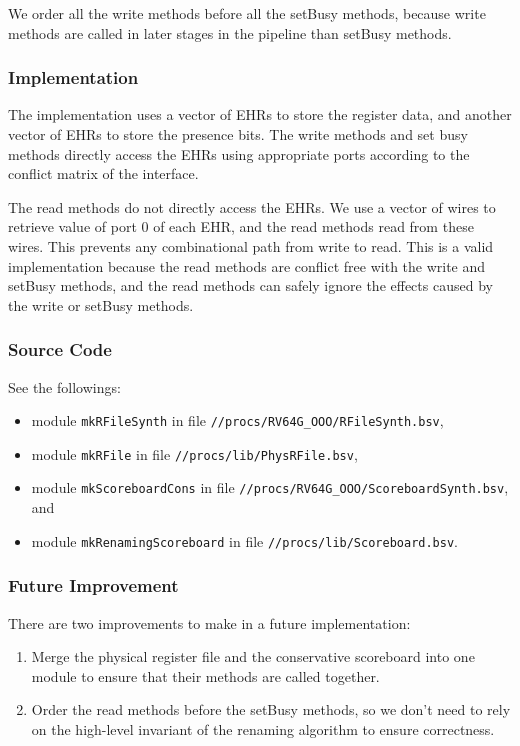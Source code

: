 We order all the write methods before all the setBusy methods, because write methods are called in later stages in the pipeline than setBusy methods.

\subsubsection{Implementation}
The implementation uses a vector of EHRs to store the register data, and another vector of EHRs to store the presence bits.
The write methods and set busy methods directly access the EHRs using appropriate ports according to the conflict matrix of the interface.

The read methods do not directly access the EHRs.
We use a vector of wires to retrieve value of port 0 of each EHR, and the read methods read from these wires.
This prevents any combinational path from write to read.
This is a valid implementation because the read methods are conflict free with the write and setBusy methods, and the read methods can safely ignore the effects caused by the write or setBusy methods.

\subsubsection{Source Code}
See the followings:
\begin{itemize}
    \item module \texttt{mkRFileSynth} in file \texttt{//procs/RV64G\_OOO/RFileSynth.bsv},
    \item module \texttt{mkRFile} in file \texttt{//procs/lib/PhysRFile.bsv},
    \item module \texttt{mkScoreboardCons} in file \texttt{//procs/RV64G\_OOO/ScoreboardSynth.bsv}, and
    \item module \texttt{mkRenamingScoreboard} in file \texttt{//procs/lib/Scoreboard.bsv}.
\end{itemize}

\subsubsection{Future Improvement}
There are two improvements to make in a future implementation:
\begin{enumerate}
    \item Merge the physical register file and the conservative scoreboard into one module to ensure that their methods are called together.
    \item Order the read methods before the setBusy methods, so we don't need to rely on the high-level invariant of the renaming algorithm to ensure correctness.
\end{enumerate}